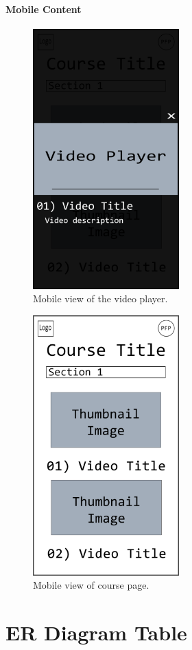 \documentclass{article}
\begin{document}
\paragraph{Mobile Content}
\vspace{\baselineskip}
\begin{figure}[h!]
    \caption{Mobile view of the video player.}
    \includegraphics[height=10cm]{mobile_course_video}
\end{figure}
\begin{figure}[h!]
    \caption{Mobile view of course page.}
    \includegraphics[height=10cm]{mobile_course_page}
\end{figure}

\clearpage
\section{ER Diagram Table}
\end{document}
